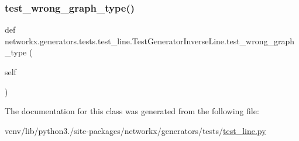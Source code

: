 \subsubsection{\texorpdfstring{test\+\_\+wrong\+\_\+graph\+\_\+type()}{test\_wrong\_graph\_type()}}
{\footnotesize\ttfamily def networkx.\+generators.\+tests.\+test\+\_\+line.\+Test\+Generator\+Inverse\+Line.\+test\+\_\+wrong\+\_\+graph\+\_\+type (\begin{DoxyParamCaption}\item[{}]{self }\end{DoxyParamCaption})}



The documentation for this class was generated from the following file\+:\begin{DoxyCompactItemize}
\item 
venv/lib/python3./site-\/packages/networkx/generators/tests/\hyperlink{test__line_8py}{test\+\_\+line.\+py}\end{DoxyCompactItemize}
